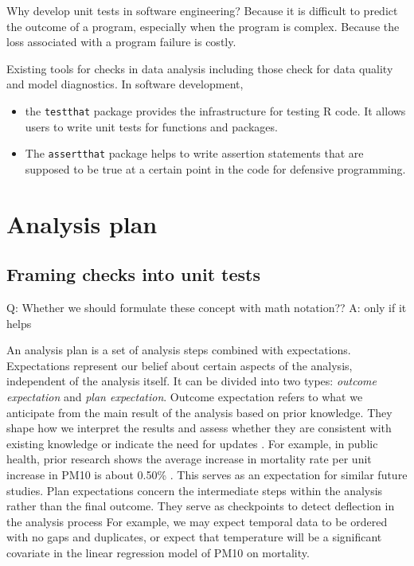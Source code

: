 \documentclass[
]{jds}
\providecommand{\tightlist}{%
  \setlength{\itemsep}{0pt}\setlength{\parskip}{0pt}}\usepackage{longtable,booktabs,array}
\begin{document}
Why develop unit tests in software engineering? Because it is difficult
to predict the outcome of a program, especially when the program is
complex. Because the loss associated with a program failure is costly.

Existing tools for checks in data analysis including those check for
data quality and model diagnostics. In software development,

\begin{itemize}
\tightlist
\item
  the \texttt{testthat} package \citep{testthat} provides the
  infrastructure for testing R code. It allows users to write unit tests
  for functions and packages.
\item
  The \texttt{assertthat} package \citep{assertthat} helps to write
  assertion statements that are supposed to be true at a certain point
  in the code for defensive programming.
\end{itemize}

\section{Analysis plan}\label{sec-plan}

\subsection{Framing checks into unit
tests}\label{framing-checks-into-unit-tests}

Q: Whether we should formulate these concept with math notation?? A:
only if it helps

An analysis plan is a set of analysis steps combined with expectations.
Expectations represent our belief about certain aspects of the analysis,
independent of the analysis itself. It can be divided into two types:
\emph{outcome expectation} and \emph{plan expectation}. Outcome
expectation refers to what we anticipate from the main result of the
analysis based on prior knowledge. They shape how we interpret the
results and assess whether they are consistent with existing knowledge
or indicate the need for updates \citep{grolemund_cognitive_2014}. For
example, in public health, prior research shows the average increase in
mortality rate per unit increase in PM10 is about 0.50\%
\citep{liu2019ambient}. This serves as an expectation for similar future
studies. Plan expectations concern the intermediate steps within the
analysis rather than the final outcome. They serve as checkpoints to
detect deflection in the analysis process For example, we may expect
temporal data to be ordered with no gaps and duplicates, or expect that
temperature will be a significant covariate in the linear regression
model of PM10 on mortality.
\end{document}
